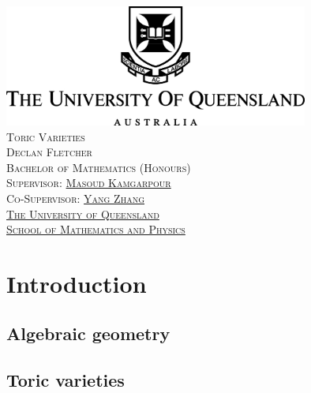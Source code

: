\documentclass[12pt]{amsart}
\theoremstyle{plain}
\begin{document}

\begin{center}
\includegraphics[width=10cm]{../images/UQLogo.jpg} \\ 
\vspace{3cm}
{\LARGE\textsc{Toric Varieties}} \\
\vspace{0.5cm}
{\textsc{Declan Fletcher}} \\
\vspace{8cm}
{\textsc{ Bachelor of Mathematics (Honours)}} \\
\vspace{1cm}
{\textsc{Supervisor: \href{https://sites.google.com/site/masoudkomi/home}{Masoud Kamgarpour}}} \\
{\textsc{Co-Supervisor: \href{https://sites.google.com/site/yangzhang139/home}{Yang Zhang}}} \\
\vspace{1cm}
{\textsc{\href{https://www.uq.edu.au/}{The University of Queensland}}} \\
{\textsc{\href{https://smp.uq.edu.au/}{School of Mathematics and Physics}}}
\end{center}

\newpage
\tableofcontents

\newpage
{}
\section{Introduction}\label{chapter:introduction}
\subsection{Algebraic geometry}





\subsection{Toric varieties}
\end{document}
